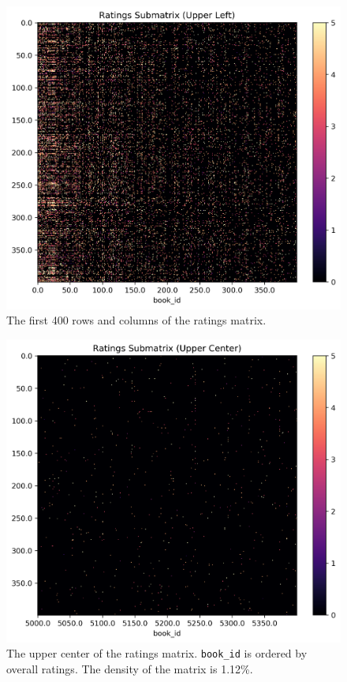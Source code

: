 \documentclass[handout]{beamer}
\begin{document}
\begin{frame}

\begin{figure}
    \centering
    \includegraphics[height=0.7\paperheight, width=0.7\linewidth]{../image/goodreads-models/ratings-submatrix-upper-left.png}
    \caption[Ratings Submatrix]{The first 400 rows and columns of the ratings matrix.}
     \label{fig:ratings-submatrix-upper-left}
\end{figure}
\end{frame}

\begin{frame}
 

\begin{figure}
    \centering
    \includegraphics[height=0.7\paperheight, width=0.7\linewidth]{../image/goodreads-models/ratings-submatrix-upper-center.png}
    \caption[Ratings Submatrix (Center)]{The upper center of the ratings matrix. \texttt{book\_id} is ordered by overall ratings. The density of the matrix is 1.12\%.}
     \label{fig:ratings-submatrix-upper-left-center}
\end{figure}
\end{frame}
\end{document}
